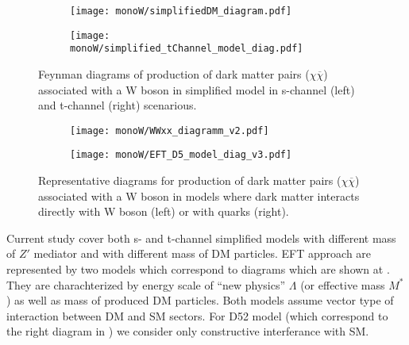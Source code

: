 



\begin{figure}[hb]

\centering
\begin{subfigure}{.5\textwidth}
  \centering
  \texttt{[image: monoW/simplifiedDM\_diagram.pdf]}
\end{subfigure}%
\begin{subfigure}{.5\textwidth}
  \centering
  \texttt{[image: monoW/simplified\_tChannel\_model\_diag.pdf]}
\end{subfigure}
  \caption{Feynman diagrams of production of dark matter pairs ($\chi\overline{\chi}$) associated with a W boson in simplified model 
	   in s-channel (left) and t-channel (right) scenarious.}
  \label{fig:feynMonoWSimple}
\end{figure}


\begin{figure}[hb]

\centering
\begin{subfigure}{.5\textwidth}
  \centering
  \texttt{[image: monoW/WWxx\_diagramm\_v2.pdf]}
\end{subfigure}%
\begin{subfigure}{.5\textwidth}
  \centering
  \texttt{[image: monoW/EFT\_D5\_model\_diag\_v3.pdf]}
\end{subfigure}
  \caption{Representative diagrams for production of dark matter pairs ($\chi\overline{\chi}$) associated with a W boson in models where
dark matter interacts directly with W boson (left) or with quarks (right).}
  \label{fig:feynMonoWEFT}
\end{figure}

Current study cover both s- and t-channel simplified models with different mass of $Z'$ mediator and with different mass of DM particles.
EFT approach are represented by two models which correspond to diagrams which are shown at . 
They are charachterized by energy scale of ``new physics'' $\Lambda$ (or effective mass $M^{*}$) as well as mass of produced DM particles.
Both models assume vector type of interaction between DM and SM sectors. For D52 model (which correspond to the right diagram in  ) 
we consider only constructive interferance with SM.

